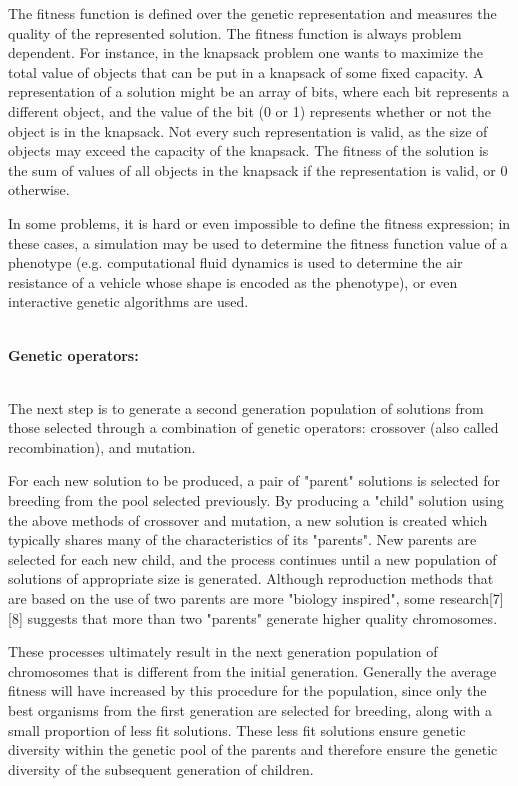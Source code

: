 \documentclass[a4paper, 12pt]{article}
\begin{document}
The fitness function is defined over the genetic representation and measures the quality of the represented solution. The fitness function is always problem dependent. For instance, in the knapsack problem one wants to maximize the total value of objects that can be put in a knapsack of some fixed capacity. A representation of a solution might be an array of bits, where each bit represents a different object, and the value of the bit (0 or 1) represents whether or not the object is in the knapsack. Not every such representation is valid, as the size of objects may exceed the capacity of the knapsack. The fitness of the solution is the sum of values of all objects in the knapsack if the representation is valid, or 0 otherwise.

In some problems, it is hard or even impossible to define the fitness expression; in these cases, a simulation may be used to determine the fitness function value of a phenotype (e.g. computational fluid dynamics is used to determine the air resistance of a vehicle whose shape is encoded as the phenotype), or even interactive genetic algorithms are used.\\~\\
\begin{large}\textbf{Genetic operators:}\end{large}\\
The next step is to generate a second generation population of solutions from those selected through a combination of genetic operators: crossover (also called recombination), and mutation.

For each new solution to be produced, a pair of "parent" solutions is selected for breeding from the pool selected previously. By producing a "child" solution using the above methods of crossover and mutation, a new solution is created which typically shares many of the characteristics of its "parents". New parents are selected for each new child, and the process continues until a new population of solutions of appropriate size is generated. Although reproduction methods that are based on the use of two parents are more "biology inspired", some research[7][8] suggests that more than two "parents" generate higher quality chromosomes.

These processes ultimately result in the next generation population of chromosomes that is different from the initial generation. Generally the average fitness will have increased by this procedure for the population, since only the best organisms from the first generation are selected for breeding, along with a small proportion of less fit solutions. These less fit solutions ensure genetic diversity within the genetic pool of the parents and therefore ensure the genetic diversity of the subsequent generation of children.
\end{document}
